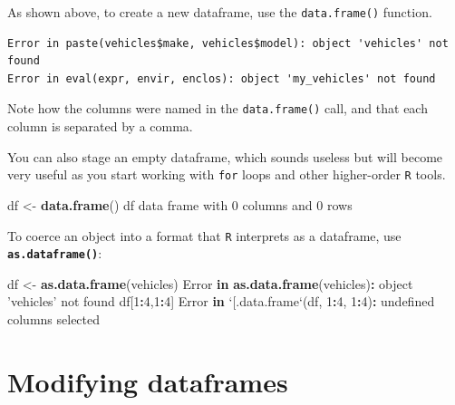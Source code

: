 \documentclass[]{book}
\newenvironment{Shaded}{\begin{snugshade}}{\end{snugshade}}
\newcommand{\ControlFlowTok}[1]{\textcolor[rgb]{0.13,0.29,0.53}{\textbf{#1}}}
\newcommand{\DataTypeTok}[1]{\textcolor[rgb]{0.13,0.29,0.53}{#1}}
\newcommand{\DecValTok}[1]{\textcolor[rgb]{0.00,0.00,0.81}{#1}}
\newcommand{\KeywordTok}[1]{\textcolor[rgb]{0.13,0.29,0.53}{\textbf{#1}}}
\newcommand{\NormalTok}[1]{#1}
\newcommand{\OperatorTok}[1]{\textcolor[rgb]{0.81,0.36,0.00}{\textbf{#1}}}
\newcommand{\StringTok}[1]{\textcolor[rgb]{0.31,0.60,0.02}{#1}}
\begin{document}
As shown above, to create a new dataframe, use the \texttt{data.frame()} function.

\begin{verbatim}
Error in paste(vehicles$make, vehicles$model): object 'vehicles' not found
Error in eval(expr, envir, enclos): object 'my_vehicles' not found
\end{verbatim}

Note how the columns were named in the \texttt{data.frame()} call, and that each column is separated by a comma.

You can also stage an empty dataframe, which sounds useless but will become very useful as you start working with \texttt{for} loops and other higher-order \texttt{R} tools.

\begin{Shaded}
\begin{Highlighting}[]
\NormalTok{df <-}\StringTok{ }\KeywordTok{data.frame}\NormalTok{()}
\NormalTok{df}
\NormalTok{data frame with }\DecValTok{0}\NormalTok{ columns and }\DecValTok{0}\NormalTok{ rows}
\end{Highlighting}
\end{Shaded}

To coerce an object into a format that \texttt{R} interprets as a dataframe, use \textbf{\texttt{as.dataframe()}}:

\begin{Shaded}
\begin{Highlighting}[]
\NormalTok{df <-}\StringTok{ }\KeywordTok{as.data.frame}\NormalTok{(vehicles)}
\NormalTok{Error }\ControlFlowTok{in} \KeywordTok{as.data.frame}\NormalTok{(vehicles)}\OperatorTok{:}\StringTok{ }\NormalTok{object }\StringTok{'vehicles'}\NormalTok{ not found}
\NormalTok{df[}\DecValTok{1}\OperatorTok{:}\DecValTok{4}\NormalTok{,}\DecValTok{1}\OperatorTok{:}\DecValTok{4}\NormalTok{]}
\NormalTok{Error }\ControlFlowTok{in} \StringTok{`}\DataTypeTok{[.data.frame}\StringTok{`}\NormalTok{(df, }\DecValTok{1}\OperatorTok{:}\DecValTok{4}\NormalTok{, }\DecValTok{1}\OperatorTok{:}\DecValTok{4}\NormalTok{)}\OperatorTok{:}\StringTok{ }\NormalTok{undefined columns selected}
\end{Highlighting}
\end{Shaded}

\hypertarget{modifying-dataframes}{%
\section*{Modifying dataframes}\label{modifying-dataframes}}
\end{document}
